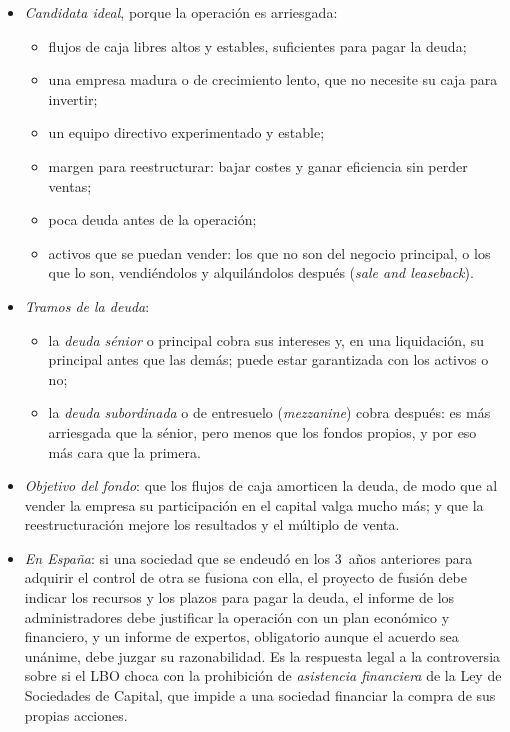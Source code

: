 \documentclass[11pt]{article}
\begin{document}
\begin{anotaciones}
\begin{itemize}
\item \emph{Candidata ideal}, porque la operación es arriesgada:
  \begin{itemize}
  \item flujos de caja libres altos y estables, suficientes para pagar la deuda;
  \item una empresa madura o de crecimiento lento, que no necesite su caja para invertir;
  \item un equipo directivo experimentado y estable;
  \item margen para reestructurar: bajar costes y ganar eficiencia sin perder ventas;
  \item poca deuda antes de la operación;
  \item activos que se puedan vender: los que no son del negocio principal, o los que lo son, vendiéndolos y alquilándolos después (\emph{sale and leaseback}).
  \end{itemize}
\item \emph{Tramos de la deuda}:
  \begin{itemize}
  \item la \emph{deuda sénior} o principal cobra sus intereses y, en una liquidación, su principal antes que las demás; puede estar garantizada con los activos o no;
  \item la \emph{deuda subordinada} o de entresuelo (\emph{mezzanine}) cobra después: es más arriesgada que la sénior, pero menos que los fondos propios, y por eso más cara que la primera.
  \end{itemize}
\item \emph{Objetivo del fondo}: que los flujos de caja amorticen la deuda, de modo que al vender la empresa su participación en el capital valga mucho más; y que la reestructuración mejore los resultados y el múltiplo de venta.
\item \emph{En España}: si una sociedad que se endeudó en los 3~años anteriores para adquirir el control de otra se fusiona con ella, el proyecto de fusión debe indicar los recursos y los plazos para pagar la deuda, el informe de los administradores debe justificar la operación con un plan económico y financiero, y un informe de expertos, obligatorio aunque el acuerdo sea unánime, debe juzgar su razonabilidad\nocite{BOE2023RDL5}. Es la respuesta legal a la controversia sobre si el LBO choca con la prohibición de \emph{asistencia financiera} de la Ley de Sociedades de Capital, que impide a una sociedad financiar la compra de sus propias acciones.
\end{itemize}
\end{anotaciones}
\end{document}
